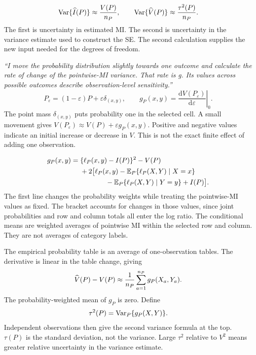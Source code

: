 \newpage
{}

\[
\operatorname{Var}\{\widehat I(P)\}\approx\frac{V(P)}{n_P},\qquad
\operatorname{Var}\{\widehat V(P)\}\approx\frac{\tau^2(P)}{n_P}.
\]
The first is uncertainty in estimated MI. The second is uncertainty in the variance estimate used to construct the SE. The second calculation supplies the new input needed for the degrees of freedom.

\emph{``I move the probability distribution slightly towards one outcome and calculate the rate of change of the pointwise-MI variance. That rate is g. Its values across possible outcomes describe observation-level sensitivity.''}
\[
P_\varepsilon=(1-\varepsilon)P+\varepsilon\delta_{(x,y)},\qquad
g_P(x,y)=\left.\frac{\mathrm dV(P_\varepsilon)}{\mathrm d\varepsilon}\right|_0.
\]
The point mass \(\delta_{(x,y)}\) puts probability one in the selected cell. A small movement gives \(V(P_\varepsilon)\approx V(P)+\varepsilon g_P(x,y)\). Positive and negative values indicate an initial increase or decrease in \(V\). This is not the exact finite effect of adding one observation.

\[
\begin{aligned}
g_P(x,y)={}&\{\ell_P(x,y)-I(P)\}^2-V(P)\\
&+2\bigl[\ell_P(x,y)-\E_P\{\ell_P(X,Y)\mid X=x\}\\
&\hspace{13mm}-\E_P\{\ell_P(X,Y)\mid Y=y\}+I(P)\bigr].
\end{aligned}
\]
The first line changes the probability weights while treating the pointwise-MI values as fixed. The bracket accounts for changes in those values, since joint probabilities and row and column totals all enter the log ratio. The conditional means are weighted averages of pointwise MI within the selected row and column. They are not averages of category labels.

The empirical probability table is an average of one-observation tables. The derivative is linear in the table change, giving
\[
\widehat V(P)-V(P)\approx\frac{1}{n_P}\sum_{a=1}^{n_P}g_P(X_a,Y_a).
\]
The probability-weighted mean of \(g_P\) is zero. Define
\[
\tau^2(P)=\operatorname{Var}_P\{g_P(X,Y)\}.
\]
Independent observations then give the second variance formula at the top. \(\tau(P)\) is the standard deviation, not the variance. Large \(\tau^2\) relative to \(V^2\) means greater relative uncertainty in the variance estimate.

